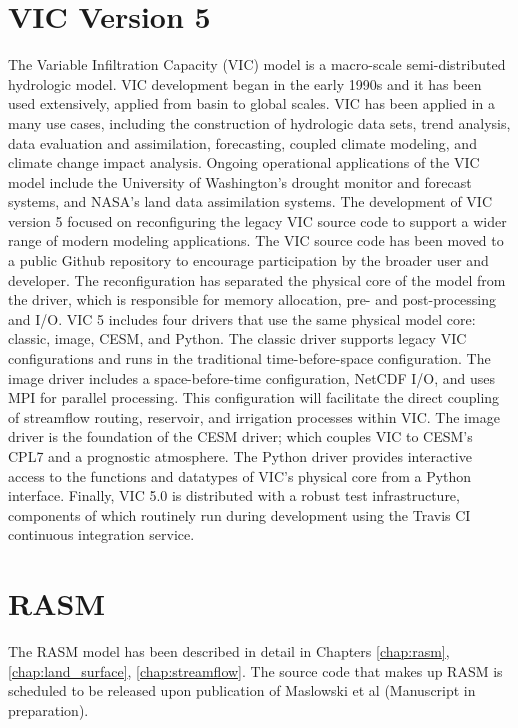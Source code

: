 \section{VIC Version 5}
\label{sec:vic_dev}
The Variable Infiltration Capacity (VIC) model is a macro-scale semi-distributed hydrologic model.
VIC development began in the early 1990s and it has been used extensively, applied from basin to global scales.
VIC has been applied in a many use cases, including the construction of hydrologic data sets, trend analysis, data evaluation and assimilation, forecasting, coupled climate modeling, and climate change impact analysis.
Ongoing operational applications of the VIC model include the University of Washington's drought monitor and forecast systems, and NASA's land data assimilation systems.
The development of VIC version 5 focused on reconfiguring the legacy VIC source code to support a wider range of modern modeling applications.
The VIC source code has been moved to a public Github repository to encourage participation by the broader user and developer.
The reconfiguration has separated the physical core of the model from the driver, which is responsible for memory allocation, pre- and post-processing and I/O.
VIC 5 includes four drivers that use the same physical model core: classic, image, CESM, and Python.
The classic driver supports legacy VIC configurations and runs in the traditional time-before-space configuration.
The image driver includes a space-before-time configuration, NetCDF I/O, and uses MPI for parallel processing.
This configuration will facilitate the direct coupling of streamflow routing, reservoir, and irrigation processes within VIC.
The image driver is the foundation of the CESM driver; which couples VIC to CESM's CPL7 and a prognostic atmosphere.
The Python driver provides interactive access to the functions and datatypes of VIC's physical core from a Python interface.
Finally, VIC 5.0 is distributed with a robust test infrastructure, components of which routinely run during development using the Travis CI continuous integration service.

\section{RASM}
\label{sec:rasm_dev}

The RASM model has been described in detail in Chapters \ref{chap:rasm}, \ref{chap:land_surface}, \ref{chap:streamflow}.
The source code that makes up RASM is scheduled to be released upon publication of Maslowski et al (Manuscript in preparation).

